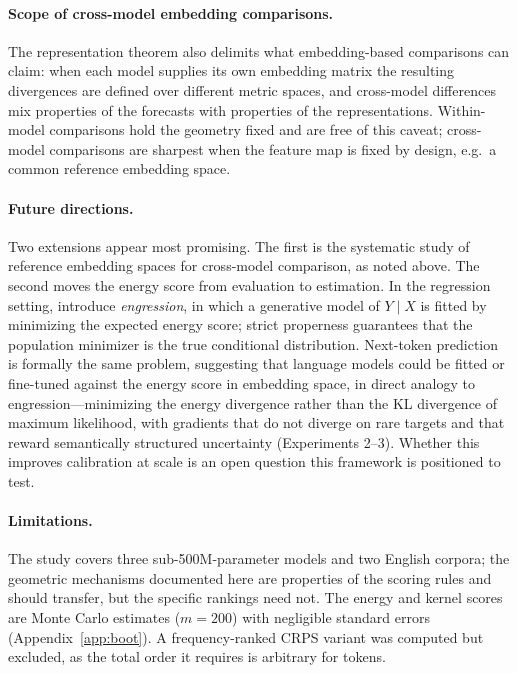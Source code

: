 \documentclass{article}
\begin{document}
\paragraph{Scope of cross-model embedding comparisons.} The representation theorem also
delimits what embedding-based comparisons can claim: when each model supplies its own
embedding matrix the resulting divergences are defined over different metric spaces, and
cross-model differences mix properties of the forecasts with properties of the
representations. Within-model comparisons hold the geometry fixed and are free of this
caveat; cross-model comparisons are sharpest when the feature map is fixed by design,
e.g.\ a common reference embedding space.

\paragraph{Future directions.} Two extensions appear most promising. The first is the
systematic study of reference embedding spaces for cross-model comparison, as noted
above. The second moves the energy score from evaluation to estimation. In the
regression setting, \citet{shen2024} introduce \emph{engression}, in which a generative
model of $Y \mid X$ is fitted by minimizing the expected energy score; strict properness
guarantees that the population minimizer is the true conditional distribution. Next-token
prediction is formally the same problem, suggesting that language models could be fitted
or fine-tuned against the energy score in embedding space, in direct analogy to
engression---minimizing the energy divergence rather than the KL divergence of maximum
likelihood, with gradients that do not diverge on rare targets and that reward
semantically structured uncertainty (Experiments 2--3). Whether this improves
calibration at scale is an open question this framework is positioned to test.

\paragraph{Limitations.} The study covers three sub-500M-parameter models and two
English corpora; the geometric mechanisms documented here are properties of the scoring
rules and should transfer, but the specific rankings need not. The energy and kernel
scores are Monte Carlo estimates ($m = 200$) with negligible standard errors
(Appendix~\ref{app:boot}). A frequency-ranked CRPS variant was computed but excluded, as
the total order it requires is arbitrary for tokens.
\end{document}
